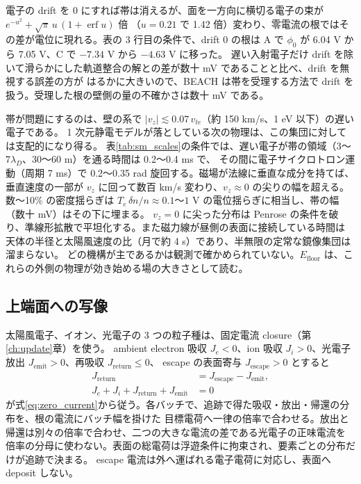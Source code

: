 電子の drift を 0 にすれば帯は消えるが、面を一方向に横切る電子の束が $e^{-u^2}+\sqrt\pi\,u\,(1+\operatorname{erf}u)$ 倍
（$u=0.21$ で 1.42 倍）変わり、零電流の根ではその差が電位に現れる。表の 3 行目の条件で、drift 0 の根は A で
$\phi_0$ が 6.04 V から 7.05 V、C で $-7.34$ V から $-4.63$ V に移った。
遅い入射電子だけ drift を除いて滑らかにした軌道整合の解との差が数十 mV であることと比べ、drift を無視する誤差の方が
はるかに大きいので、BEACH は帯を受理する方法で drift を扱う。受理した根の壁側の量の不確かさは数十 mV である。

帯が問題にするのは、壁の系で $|v_z|\lesssim0.07\,v_{te}$（約 150 km/s、1 eV 以下）の遅い電子である。
1 次元静電モデルが落としている次の物理は、この集団に対しては支配的になり得る。
表\ref{tab:sm_scales}の条件では、遅い電子が帯の領域（$3$〜$7\lambda_D$、30〜60 m）を通る時間は 0.2〜0.4 ms で、
その間に電子サイクロトロン運動（周期 7 ms）で 0.2〜0.35 rad 旋回する。磁場が法線に垂直な成分を持てば、
垂直速度の一部が $v_z$ に回って数百 km/s 変わり、$v_z\approx0$ の尖りの幅を超える。
数〜10\% の密度揺らぎは $T_e\,\delta n/n\approx0.1$〜$1$ V の電位揺らぎに相当し、帯の幅（数十 mV）はその下に埋まる。
$v_z=0$ に尖った分布は Penrose の条件を破り、準線形拡散で平坦化する。また磁力線が昼側の表面に接続している時間は
天体の半径と太陽風速度の比（月で約 4 s）であり、半無限の定常な鏡像集団は溜まらない。
どの機構が主であるかは観測で確かめられていない。$E_{\mathrm{floor}}$ は、これらの外側の物理が効き始める場の大きさとして読む。

\subsection{上端面への写像}
太陽風電子、イオン、光電子の 3 つの粒子種は、固定電流 closure（第\ref{ch:update}章）を使う。
ambient electron 吸収 $J_e<0$、ion 吸収 $J_i>0$、光電子放出 $J_{\mathrm{emit}}>0$、再吸収 $J_{\mathrm{return}}\le0$、
escape の表面寄与 $J_{\mathrm{escape}}>0$ とすると
\begin{align}
 J_{\mathrm{return}}&=J_{\mathrm{escape}}-J_{\mathrm{emit}},\\
 J_e+J_i+J_{\mathrm{return}}+J_{\mathrm{emit}}&=0
 \label{eq:stationary_budget}
\end{align}
が式\eqref{eq:zero_current}から従う。各バッチで、追跡で得た吸収・放出・帰還の分布を、根の電流にバッチ幅を掛けた
目標電荷へ一律の倍率で合わせる。放出と帰還は別々の倍率で合わせ、二つの大きな電流の差である光電子の正味電流を
倍率の分母に使わない。表面の総電荷は浮遊条件に拘束され、要素ごとの分布だけが追跡で決まる。
escape 電流は外へ運ばれる電子電荷に対応し、表面へ deposit しない。

